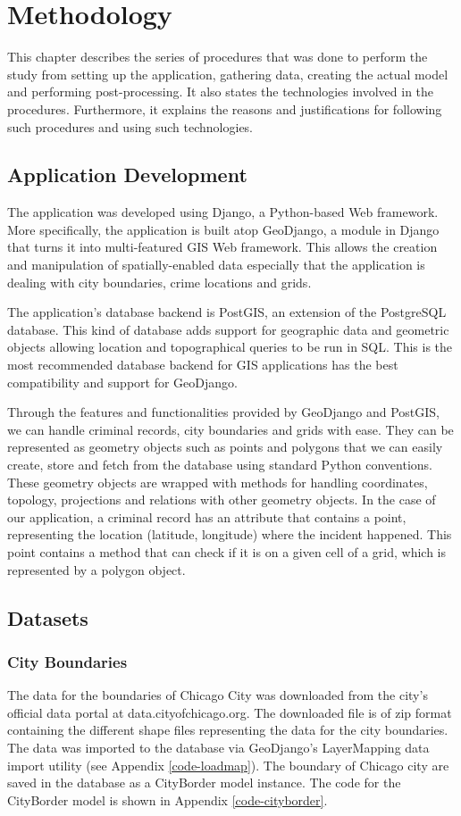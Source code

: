 \chapter{Methodology}
    This chapter describes the series of procedures that was done to perform the study \textemdash from setting up the application, gathering data, creating the actual model and performing post-processing. It also states the technologies involved in the procedures. Furthermore, it explains the reasons and justifications for following such procedures and using such technologies.
\section{Application Development}
    The application was developed using Django, a Python-based Web framework. More specifically, the application is built atop GeoDjango, a module in Django that turns it into multi-featured GIS Web framework. This allows the creation and manipulation of spatially-enabled data especially that the application is dealing with city boundaries, crime locations and grids.

    The application's database backend is PostGIS, an extension of the PostgreSQL database. This kind of database adds support for geographic data and geometric objects allowing location and topographical queries to be run in SQL. This is the most recommended database backend for GIS applications has the best compatibility and support for GeoDjango.

    Through the features and functionalities provided by GeoDjango and PostGIS, we can handle criminal records, city boundaries and grids with ease. They can be represented as geometry objects such as points and polygons that we can easily create, store and fetch from the database using standard Python conventions. These geometry objects are wrapped with methods for handling coordinates, topology, projections and relations with other geometry objects. In the case of our application, a criminal record has an attribute that contains a point, representing the location (latitude, longitude) where the incident happened. This point contains a method that can check if it is on a given cell of a grid, which is represented by a polygon object.

\section{Datasets}
    \subsection{City Boundaries}
        The data for the boundaries of Chicago City was downloaded from the city's official data portal at data.cityofchicago.org. The downloaded file is of zip format containing the different shape files representing the data for the city boundaries. The data was imported to the database via GeoDjango's LayerMapping data import utility (see Appendix \ref{code-loadmap}). The boundary of Chicago city are saved in the database as a CityBorder model instance. The code for the CityBorder model is shown in Appendix \ref{code-cityborder}. 
